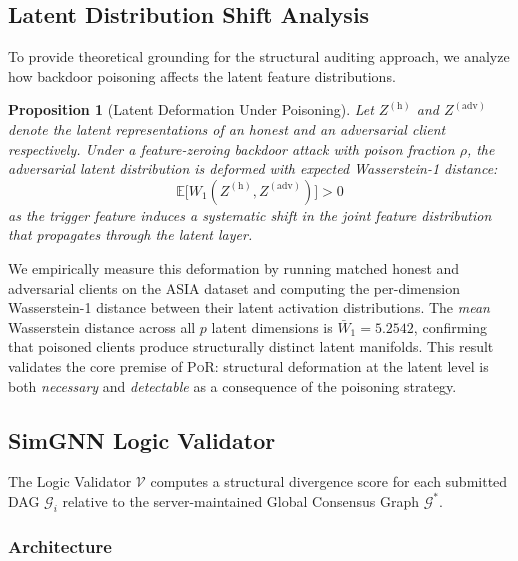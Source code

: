 \documentclass[journal]{IEEEtran}
\newtheorem{proposition}{Proposition}
\newcommand{\por}{\textsc{PoR}}
\newcommand{\calG}{\mathcal{G}}
\begin{document}
\subsection{Latent Distribution Shift Analysis}
\label{sec:wasserstein}

To provide theoretical grounding for the structural auditing approach, we
analyze how backdoor poisoning affects the latent feature distributions.

\begin{proposition}[Latent Deformation Under Poisoning]
Let $Z^{(\mathrm{h})}$ and $Z^{(\mathrm{adv})}$ denote the latent
representations of an honest and an adversarial client respectively.
Under a feature-zeroing backdoor attack with poison fraction $\rho$, the
adversarial latent distribution is deformed with expected Wasserstein-1
distance:
\begin{equation}
  \mathbb{E}\bigl[W_1(Z^{(\mathrm{h})}, Z^{(\mathrm{adv})})\bigr] > 0
\end{equation}
as the trigger feature induces a systematic shift in the joint feature
distribution that propagates through the latent layer.
\end{proposition}

We empirically measure this deformation by running matched honest and
adversarial clients on the ASIA dataset and computing the per-dimension
Wasserstein-1 distance between their latent activation distributions.
The \textit{mean} Wasserstein distance across all $p$ latent dimensions
is $\bar{W}_1 = 5.2542$, confirming that poisoned clients produce
structurally distinct latent manifolds. This result validates the core
premise of \por{}: structural deformation at the latent level is both
\textit{necessary} and \textit{detectable} as a consequence of the poisoning
strategy.

\subsection{SimGNN Logic Validator}
\label{sec:simgnn}

The Logic Validator $\mathcal{V}$ computes a structural divergence score
for each submitted DAG $\calG_i$ relative to the server-maintained Global
Consensus Graph $\calG^*$.

\subsubsection{Architecture}
\end{document}
